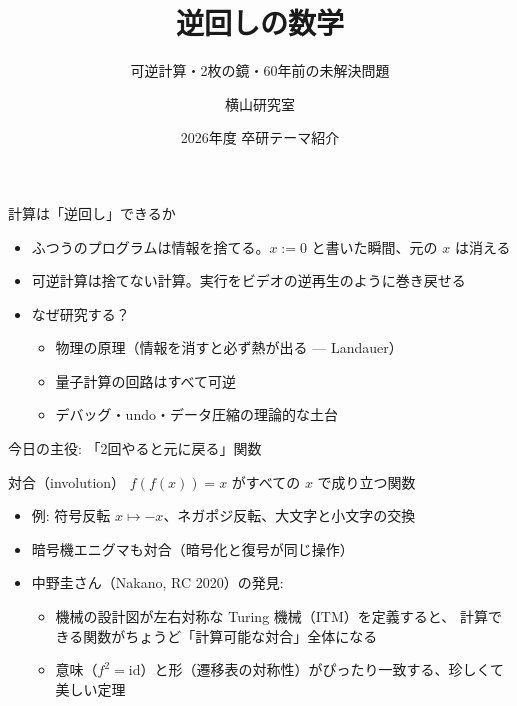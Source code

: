 \documentclass[aspectratio=169,11pt]{beamer}
\title{逆回しの数学}
\subtitle{可逆計算・2枚の鏡・60年前の未解決問題}
\author{横山研究室}
\date{2026年度 卒研テーマ紹介}
\begin{document}
\begin{frame}
  \titlepage
\end{frame}

\begin{frame}{計算は「逆回し」できるか}
  \begin{itemize}
    \item ふつうのプログラムは情報を捨てる。\(x \mathrel{:=} 0\) と書いた瞬間、元の \(x\) は消える
    \item \alert{可逆計算}は捨てない計算。実行をビデオの逆再生のように巻き戻せる
    \item なぜ研究する？
    \begin{itemize}
      \item 物理の原理（情報を消すと必ず熱が出る --- Landauer）
      \item 量子計算の回路はすべて可逆
      \item デバッグ・undo・データ圧縮の理論的な土台
    \end{itemize}
  \end{itemize}
\end{frame}

\begin{frame}{今日の主役: 「2回やると元に戻る」関数}
  \begin{block}{対合（involution）}
    \(f(f(x)) = x\) がすべての \(x\) で成り立つ関数
  \end{block}
  \begin{itemize}
    \item 例: 符号反転 \(x \mapsto -x\)、ネガポジ反転、大文字と小文字の交換
    \item 暗号機エニグマも対合（暗号化と復号が同じ操作）
    \item 中野圭さん（Nakano, RC 2020）の発見:
    \begin{itemize}
      \item \alert{機械の設計図が左右対称}な Turing 機械（ITM）を定義すると、
        計算できる関数がちょうど「計算可能な対合」全体になる
      \item 意味（\(f^2 = \mathrm{id}\)）と形（遷移表の対称性）がぴったり一致する、珍しくて美しい定理
    \end{itemize}
  \end{itemize}
\end{frame}
\end{document}
